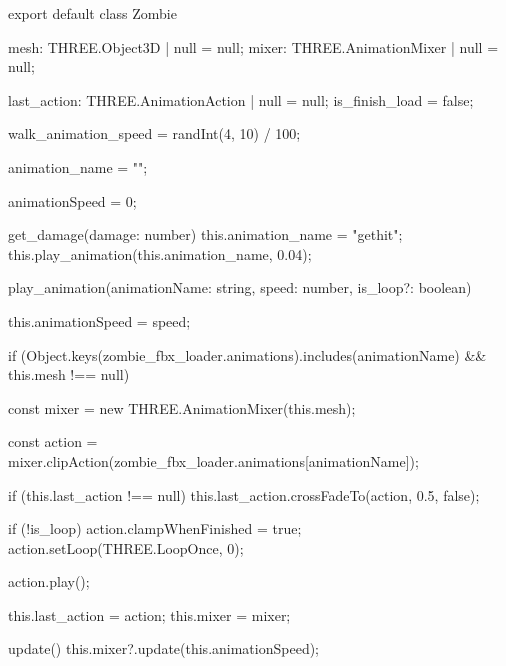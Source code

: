 
export default class Zombie {
    mesh: THREE.Object3D | null = null;
    mixer: THREE.AnimationMixer | null = null;

    last_action: THREE.AnimationAction | null = null;
    is_finish_load = false;

    walk_animation_speed = randInt(4, 10) / 100;

    animation_name = "";
    
    animationSpeed = 0;




    get_damage(damage: number) {
        this.animation_name = "gethit";
        this.play_animation(this.animation_name, 0.04);
    }
 
    play_animation(animationName: string, speed: number, is_loop?: boolean) {
        this.animationSpeed = speed;

        if (Object.keys(zombie_fbx_loader.animations).includes(animationName) && this.mesh !== null) {
            const mixer = new THREE.AnimationMixer(this.mesh);
            
            const action = mixer.clipAction(zombie_fbx_loader.animations[animationName]);

            if (this.last_action !== null) {
                this.last_action.crossFadeTo(action, 0.5, false);
            }

            if (!is_loop) {
                action.clampWhenFinished = true;
                action.setLoop(THREE.LoopOnce, 0);
            }

            action.play();
            
            this.last_action = action;
            this.mixer = mixer;
        }
    }

    
    update() 
    {
        this.mixer?.update(this.animationSpeed);
    }
}
